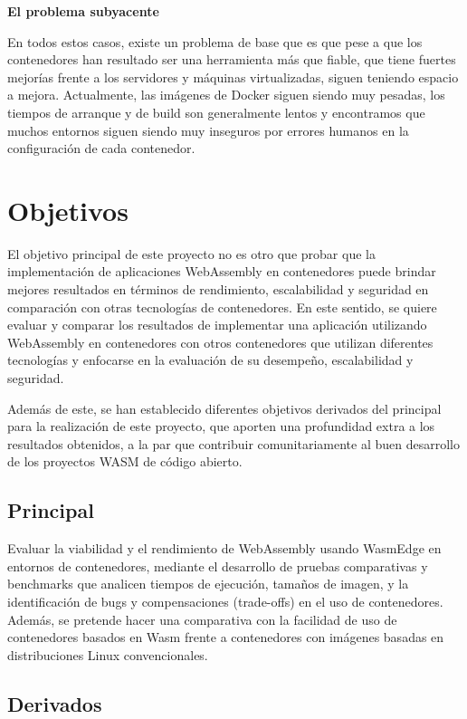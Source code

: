 \textbf{El problema subyacente}

En todos estos casos, existe un problema de base que es que pese a que los contenedores han resultado ser una herramienta más que fiable, que tiene fuertes mejorías frente a los servidores y máquinas virtualizadas, siguen teniendo espacio a mejora. Actualmente, las imágenes de Docker siguen siendo muy pesadas, los tiempos de arranque y de build son generalmente lentos y encontramos que muchos entornos siguen siendo muy inseguros por errores humanos en la configuración de cada contenedor.

 
\section{Objetivos}

El objetivo principal de este proyecto no es otro que probar que la implementación de aplicaciones WebAssembly en contenedores puede brindar mejores resultados en términos de rendimiento, escalabilidad y seguridad en comparación con otras tecnologías de contenedores. En este sentido, se quiere evaluar y comparar los resultados de implementar una aplicación utilizando WebAssembly en contenedores con otros contenedores que utilizan diferentes tecnologías y enfocarse en la evaluación de su desempeño, escalabilidad y seguridad.

Además de este, se han establecido diferentes objetivos derivados del principal para la realización de este proyecto, que aporten una profundidad extra a los resultados obtenidos, a la par que contribuir comunitariamente al buen desarrollo de los proyectos WASM de código abierto.

\subsection{Principal}

Evaluar la viabilidad y el rendimiento de WebAssembly usando WasmEdge en entornos de contenedores, mediante el desarrollo de pruebas comparativas y benchmarks que analicen tiempos de ejecución, tamaños de imagen, y la identificación de bugs y compensaciones (trade-offs) en el uso de contenedores. Además, se pretende hacer una comparativa con la facilidad de uso de contenedores basados en Wasm frente a contenedores con imágenes basadas en distribuciones Linux convencionales.

\subsection{Derivados}

